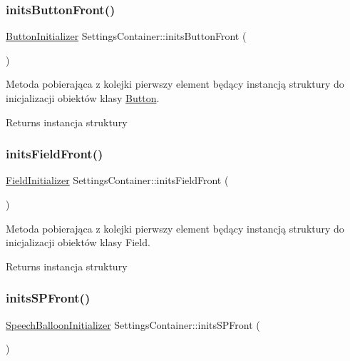 \subsubsection{\texorpdfstring{initsButtonFront()}{initsButtonFront()}}
{\footnotesize\ttfamily \mbox{\hyperlink{struct_button_initializer}{Button\+Initializer}} Settings\+Container\+::inits\+Button\+Front (\begin{DoxyParamCaption}{ }\end{DoxyParamCaption})}



Metoda pobierająca z kolejki pierwszy element będący instancją struktury do inicjalizacji obiektów klasy \mbox{\hyperlink{class_button}{Button}}. 

\begin{DoxyReturn}{Returns}
instancja struktury 
\end{DoxyReturn}
\mbox{\label{class_settings_container_ad0da265e5c15f125e07f3759a0585d07}} 
\subsubsection{\texorpdfstring{initsFieldFront()}{initsFieldFront()}}
{\footnotesize\ttfamily \mbox{\hyperlink{struct_field_initializer}{Field\+Initializer}} Settings\+Container\+::inits\+Field\+Front (\begin{DoxyParamCaption}{ }\end{DoxyParamCaption})}



Metoda pobierająca z kolejki pierwszy element będący instancją struktury do inicjalizacji obiektów klasy Field. 

\begin{DoxyReturn}{Returns}
instancja struktury 
\end{DoxyReturn}
\mbox{\label{class_settings_container_ae0a7d9865c607f08cbdadbdc69d0707c}} 
\subsubsection{\texorpdfstring{initsSPFront()}{initsSPFront()}}
{\footnotesize\ttfamily \mbox{\hyperlink{struct_speech_balloon_initializer}{Speech\+Balloon\+Initializer}} Settings\+Container\+::inits\+S\+P\+Front (\begin{DoxyParamCaption}{ }\end{DoxyParamCaption})}



